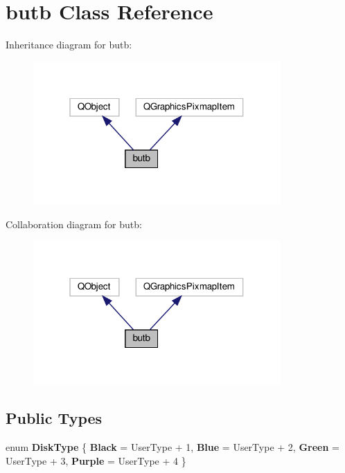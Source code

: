 \hypertarget{classbutb}{}\section{butb Class Reference}
\label{classbutb}


Inheritance diagram for butb\+:
\nopagebreak
\begin{figure}[H]
\begin{center}
\leavevmode
\includegraphics[width=268pt]{classbutb__inherit__graph}
\end{center}
\end{figure}


Collaboration diagram for butb\+:
\nopagebreak
\begin{figure}[H]
\begin{center}
\leavevmode
\includegraphics[width=268pt]{classbutb__coll__graph}
\end{center}
\end{figure}
\subsection*{Public Types}
\begin{DoxyCompactItemize}
\item 
\mbox{\label{classbutb_a1a07f03f7feef35e03fea73d8d430377}} 
enum {\bfseries Disk\+Type} \{ {\bfseries Black} = User\+Type + 1, 
{\bfseries Blue} = User\+Type + 2, 
{\bfseries Green} = User\+Type + 3, 
{\bfseries Purple} = User\+Type + 4
 \}
\end{DoxyCompactItemize}
